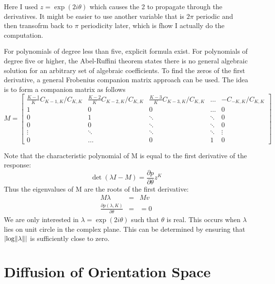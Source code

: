 \documentclass{article}
\DeclarePairedDelimiter\abs{\lvert}{\rvert}%
\DeclarePairedDelimiter\norm{\lVert}{\rVert}%
\begin{document}
{\color{red} Here I used $ z = \exp(2i\theta) $ which causes the 2 to propagate through the derivatives. It might be easier to use another variable that is $ 2 \pi $ periodic and then transofrm back to $ \pi $ periodicity later, which is fhow I actually do the computation.}

For polynomials of degree less than five, explicit formula exist. For polynomials of degree five or higher, the Abel-Ruffini theorem states there is no general algebraic solution for an arbitrary set of algebraic coefficients.
To find the zeros of the first derivative, a general Frobenius companion matrix approach can be used. The idea is to form a companion matrix as follows
\[
	M = \begin{bmatrix}
		\frac{K-1}{K} C_{K-1,K}/C_{K,K}  & \frac{K-2}{K} C_{K-2,K}/C_{K,K} & \frac{K-3}{K} C_{K-3,K}/C_{K,K} & \dots & -C_{-K,K}/C_{K,K} \\
		1                  & 0                 & 0                 & \dots & 0 \\
		0                  & 1                 & \ddots            & \ddots & 0 \\
		0                  & 0                 & \ddots            & \ddots & 0 \\
		\vdots             & \ddots            & \ddots            & \ddots& \vdots \\
		0                  & \dots                 & 0                 & 1     & 0 
	\end{bmatrix}
\]

Note that the characteristic polynomial of M is equal to the first derivative of the response:
\[ \det(\lambda I - M ) = \frac{\partial p}{\partial \theta} z^{K} \]
Thus the eigenvalues of M are the roots of the first derivative:
\begin{eqnarray}
	M \lambda & = & M v \\
	\frac{\partial p(\lambda,K)}{\partial \theta} & = & =0
\end{eqnarray}
We are only interested in $ \lambda = \exp(2i\theta) $ such that $ \theta $ is real. This occurs when $ \lambda $ lies on unit circle in the complex plane. This can be determined by ensuring that $ \abs{ \log \norm{\lambda} } $ is sufficiently close to zero.



\section{Diffusion of Orientation Space}
\end{document}
